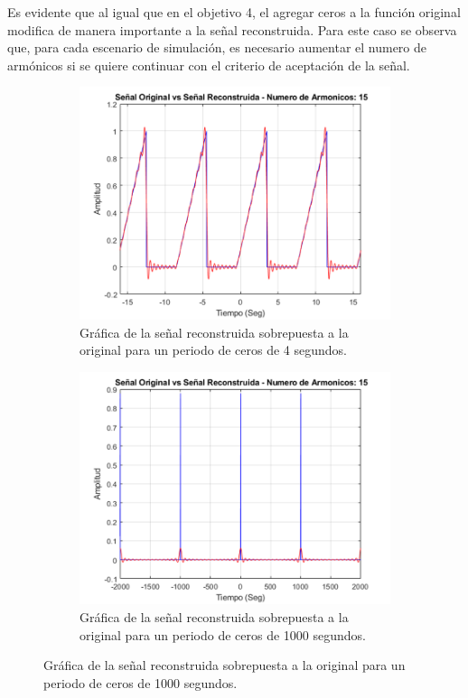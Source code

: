 \documentclass[11pt,a4paper,twocolumn]{article}
\begin{document}
    Es evidente que al igual que en el objetivo 4, el agregar ceros a la función original modifica 
    de manera importante a la señal reconstruida. Para este caso se observa que, para cada 
    escenario de simulación, es necesario aumentar el numero de armónicos si se quiere 
    continuar con el criterio de aceptación de la señal.

    \begin{figure}[H]
        \centering 
        \begin{subfigure}[h]{0.45\linewidth}
            \includegraphics[width=\linewidth]{img/figure8_A.png}
            \caption{Gráfica de la señal reconstruida sobrepuesta a la original para un periodo de ceros de 4 segundos.}
            \label{figure8_A}
        \end{subfigure}
        \begin{subfigure}[h]{0.45\linewidth}
            \includegraphics[width=\linewidth]{img/figure8_B.png}
            \caption{Gráfica de la señal reconstruida sobrepuesta a la original para un periodo de ceros de 1000 segundos.}
            \label{figure8_B}
        \end{subfigure}
        \label{figure8}
    \end{figure}
\end{document}
